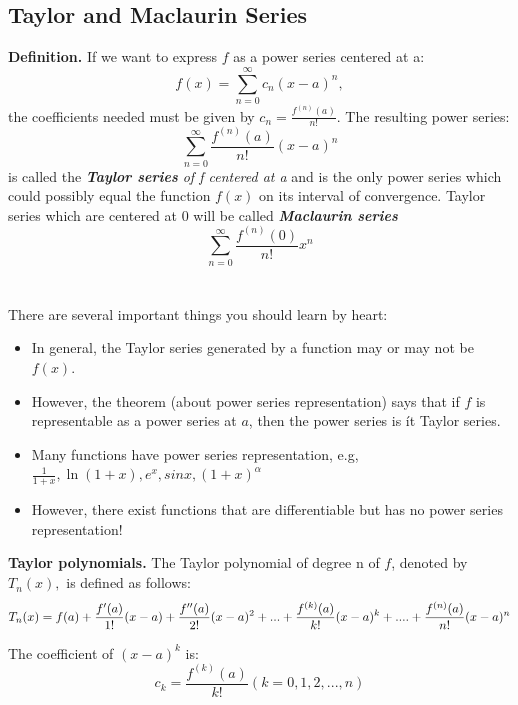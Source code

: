 \documentclass{article}
\begin{document}
\subsection{Taylor and Maclaurin Series}
\textbf{Definition.} If we want to express $f$ as a power series centered at a: 
$$ f(x) = \sum_{n=0}^{\infty} c_n (x-a)^n,$$
the coefficients needed must be given by $c_n = \frac{f^{(n)}(a)}{n!}$. The resulting power series: 
$$ \sum_{n=0}^{\infty} \frac{f^{(n)}(a)}{n!} (x-a)^n$$
is called the \textit{\textbf{Taylor series} of f centered at a} and is the only power series which could possibly equal the function $f(x)$ on its interval of convergence. Taylor series which are centered at 0 will be called \textit{\textbf{Maclaurin series}}
$$ \sum_{n=0}^{\infty} \frac{f^{(n)}(0)}{n!}x^n$$
\\ 
\\
There are several important things you should learn by heart: 
\begin{itemize}
    \item In general, the Taylor series generated by a function may or may not be $f(x)$.
    \item However, the theorem (about power series representation) says that if $f$ is representable as a power series at $a$, then the power series is ít Taylor series.
    \item Many functions have power series representation, e.g, $\frac{1}{1+x}, \ln{(1+x)}, e^x, sin x, (1+x)^{\alpha}$
    \item However, there exist functions that are differentiable but has no power series representation!
\end{itemize}

\textbf{Taylor polynomials.} The Taylor polynomial of degree n of $f$, denoted by $T_n(x),$ is defined as follows:
$$ T_n(x) = f(a) + \frac{f'(a)}{1!}(x-a) + \frac{f''(a)}{2!}(x-a)^2 + ... \\
+ \frac{f^{(k)}(a)}{k!}(x-a)^k + .... + \frac{f^{(n)}(a)}{n!}(x-a)^n$$

The coefficient of $(x-a)^k $  is:
$$ c_k = \frac{f^{(k)}(a)}{k!} (k = 0, 1, 2, ..., n)$$  
\end{document}
